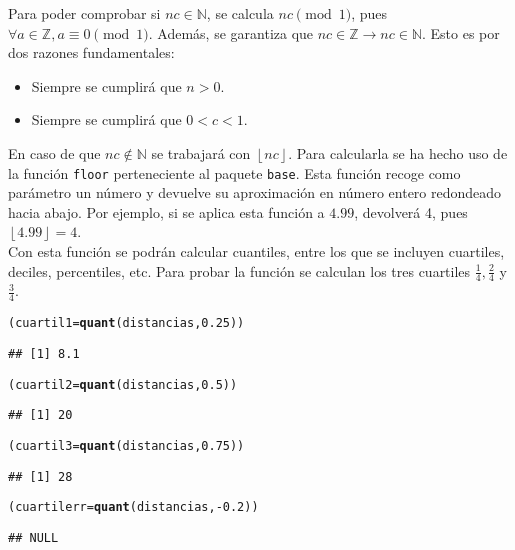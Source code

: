 \documentclass[12pt]{report}\usepackage[]{graphicx}\usepackage[dvipsnames]{xcolor}
\makeatletter
\newcommand{\hlnum}[1]{\textcolor[rgb]{0.686,0.059,0.569}{#1}}%
\newcommand{\hlopt}[1]{\textcolor[rgb]{0,0,0}{#1}}%
\newcommand{\hlstd}[1]{\textcolor[rgb]{0.345,0.345,0.345}{#1}}%
\newcommand{\hlkwb}[1]{\textcolor[rgb]{0.69,0.353,0.396}{#1}}%
\newcommand{\hlkwd}[1]{\textcolor[rgb]{0.737,0.353,0.396}{\textbf{#1}}}%
\newenvironment{kframe}{%
 \def\at@end@of@kframe{}%
 \ifinner\ifhmode%
  \def\at@end@of@kframe{\end{minipage}}%
  \begin{minipage}{\columnwidth}%
 \fi\fi%
 \def\FrameCommand##1{\hskip\@totalleftmargin \hskip-\fboxsep
 \colorbox{shadecolor}{##1}\hskip-\fboxsep
     \hskip-\linewidth \hskip-\@totalleftmargin \hskip\columnwidth}%
 \MakeFramed {\advance\hsize-\width
   \@totalleftmargin\z@ \linewidth\hsize
   \@setminipage}}%
 {\par\unskip\endMakeFramed%
 \at@end@of@kframe}
\newenvironment{knitrout}{}{} %
\makeatother
\begin{document}
			Para poder comprobar si $nc \in \mathbb{N}$,  se calcula $nc \pmod{1}$, pues $\forall a \in \mathbb{Z}, a \equiv 0 \pmod{1}$. Además, se garantiza que $nc \in \mathbb{Z} \rightarrow nc \in \mathbb{N}$. Esto es por dos razones fundamentales:
			
			\begin{itemize}
				\item Siempre se cumplirá que $n > 0$. 
				\item Siempre se cumplirá que $0 < c < 1$. 
			\end{itemize}
			
			En caso de que $nc \not \in \mathbb{N}$ se trabajará con $\left\lfloor nc \right\rfloor$. Para calcularla se ha hecho uso de la función \texttt{floor} perteneciente al paquete \texttt{base}. Esta función recoge como parámetro un número y devuelve su aproximación en número entero redondeado hacia abajo. Por ejemplo, si se aplica esta función a $4.99$, devolverá 4, pues $\left\lfloor4.99\right\rfloor = 4$.\\
			
			Con esta función se podrán calcular cuantiles, entre los que se incluyen cuartiles, deciles, percentiles, etc. Para probar la función se calculan los tres cuartiles $\frac{1}{4}, \frac{2}{4}$ y $\frac{3}{4}$.
			
\begin{knitrout}
\color{fgcolor}\begin{kframe}
\begin{alltt}
\hlstd{(cuartil1} \hlkwb{=} \hlkwd{quant}\hlstd{(distancias,}\hlnum{0.25}\hlstd{))}
\end{alltt}
\begin{verbatim}
## [1] 8.1
\end{verbatim}
\begin{alltt}
\hlstd{(cuartil2} \hlkwb{=} \hlkwd{quant}\hlstd{(distancias,}\hlnum{0.5}\hlstd{))}
\end{alltt}
\begin{verbatim}
## [1] 20
\end{verbatim}
\begin{alltt}
\hlstd{(cuartil3} \hlkwb{=} \hlkwd{quant}\hlstd{(distancias,}\hlnum{0.75}\hlstd{))}
\end{alltt}
\begin{verbatim}
## [1] 28
\end{verbatim}
\begin{alltt}
\hlstd{(cuartilerr} \hlkwb{=} \hlkwd{quant}\hlstd{(distancias,} \hlopt{-}\hlnum{0.2}\hlstd{))}
\end{alltt}
\begin{verbatim}
## NULL
\end{verbatim}
\end{kframe}
\end{knitrout}
			
\end{document}

